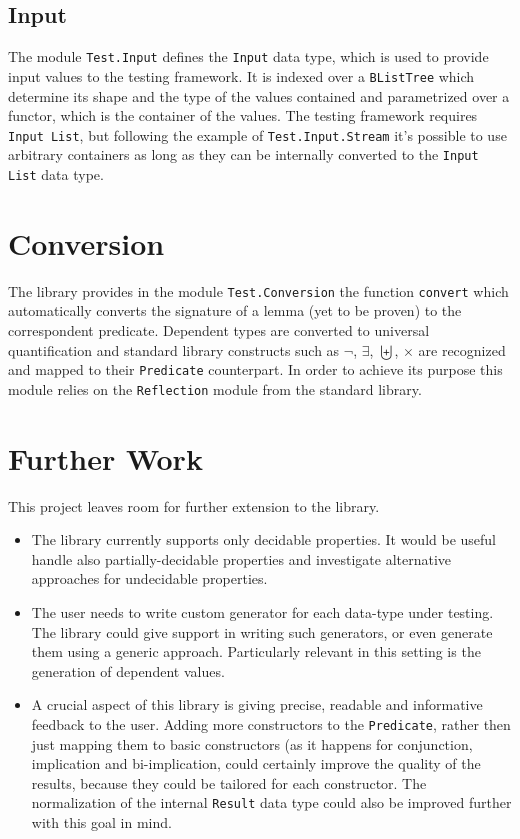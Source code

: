 \documentclass[10pt,a4paper]{article}
\begin{document}
\subsection{Input}
The module \texttt{Test.Input} defines the \texttt{Input} data type, which is used to provide input values to the testing framework.
It is indexed over a \texttt{BListTree} which determine its shape and the type of the values contained and parametrized over a functor, which is the container of the values.
The testing framework requires \texttt{Input List}, but following the example of \texttt{Test.Input.Stream} it's possible to use arbitrary containers as long as they can be internally converted to the \texttt{Input List} data type.


\section{Conversion}
The library provides in the module \texttt{Test.Conversion} the function \texttt{convert} which automatically converts the signature of a lemma (yet to be proven) to the correspondent predicate. Dependent types are converted to universal quantification and standard library constructs such as $\neg$, $\exists$, $\biguplus$, $\times$ are recognized and mapped to their \texttt{Predicate} counterpart.
In order to achieve its purpose this module relies on the \texttt{Reflection} module from the standard library.

\section{Further Work}
This project leaves room for further extension to the library.
\begin{itemize}
	\item The library currently supports only decidable properties. It would be useful handle also partially-decidable properties and investigate alternative approaches for undecidable properties.
	\item The user needs to write custom generator for each data-type under testing. The library could give support in writing such generators, or even generate them using a generic approach. Particularly relevant in this setting is the generation of dependent values.
	\item A crucial aspect of this library is giving precise, readable and informative feedback to the user. Adding more constructors to the \texttt{Predicate}, rather then just mapping them to basic constructors (as it happens for conjunction, implication and bi-implication, could certainly improve the quality of the results, because they could be tailored for each constructor. The normalization of the internal \texttt{Result} data type could also be improved further with this goal in mind.
\end{itemize}
\end{document}
